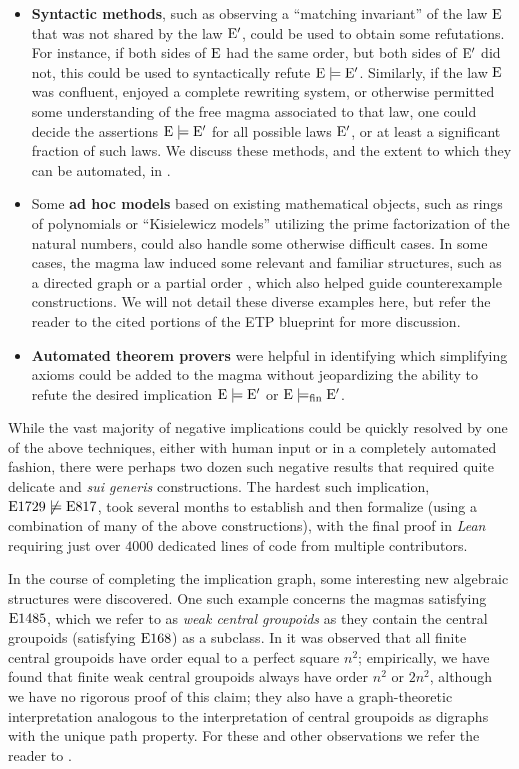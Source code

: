 \begin{itemize}
        \item \textbf{Syntactic methods}, such as observing a ``matching invariant'' of the law $\mathrm{E}$ that was not shared by the law ${\mathrm{E}'}$, could be used to obtain some refutations.  For instance, if both sides of $\mathrm{E}$ had the same order, but both sides of ${\mathrm{E}'}$ did not, this could be used to syntactically refute ${\mathrm{E}} \models {\mathrm{E}'}$.  Similarly, if the law $\mathrm{E}$ was confluent, enjoyed a complete rewriting system, or otherwise permitted some understanding of the free magma associated to that law, one could decide the assertions ${\mathrm{E}} \models {\mathrm{E}'}$ for all possible laws ${\mathrm{E}'}$, or at least a significant fraction of such laws.  We discuss these methods, and the extent to which they can be automated, in .
        \item Some \textbf{ad hoc models} based on existing mathematical objects, such as rings of polynomials \cite[Section~7.7]{ETP_blueprint} or ``Kisielewicz models'' \cite[Section~5.1]{ETP_blueprint} utilizing the prime factorization of the natural numbers, could also handle some otherwise difficult cases.  In some cases, the magma law induced some relevant and familiar structures, such as a directed graph \cite[Chapter~12 and Section~14.2]{ETP_blueprint} or a partial order \cite[Section~14.1]{ETP_blueprint}, which also helped guide counterexample constructions. We will not detail these diverse examples here, but refer the reader to the cited portions of the ETP blueprint for more discussion.
        \item \textbf{Automated theorem provers} were helpful in identifying which simplifying axioms could be added to the magma without jeopardizing the ability to refute the desired implication ${\mathrm{E}} \models {\mathrm{E}'}$ or ${\mathrm{E}} \models_{\mathrm{fin}} {\mathrm{E}'}$.
\end{itemize}

While the vast majority of negative implications could be quickly resolved by one of the above techniques, either with human input or in a completely automated fashion, there were perhaps two dozen such negative results that required quite delicate and \emph{sui generis} constructions.  The hardest such implication, $\mathrm{E}1729 \not\models \mathrm{E}817$, took several months to establish and then formalize (using a combination of many of the above constructions), with the final proof in \emph{Lean} requiring just over $\num{4000}$ dedicated lines of code from multiple contributors.

In the course of completing the implication graph, some interesting new algebraic structures were discovered.  One such example concerns the magmas satisfying $\mathrm{E}1485$, which we refer to as \emph{weak central groupoids} as they contain the central groupoids (satisfying $\mathrm{E}168$) as a subclass.  In \cite{knuth} it was observed that all finite central groupoids have order equal to a perfect square $n^2$; empirically, we have found that finite weak central groupoids always have order $n^2$ or $2n^2$, although we have no rigorous proof of this claim; they also have a graph-theoretic interpretation analogous to the interpretation of central groupoids as digraphs with the unique path property.  For these and other observations we refer the reader to \cite[Chapter~12]{ETP_blueprint}.

